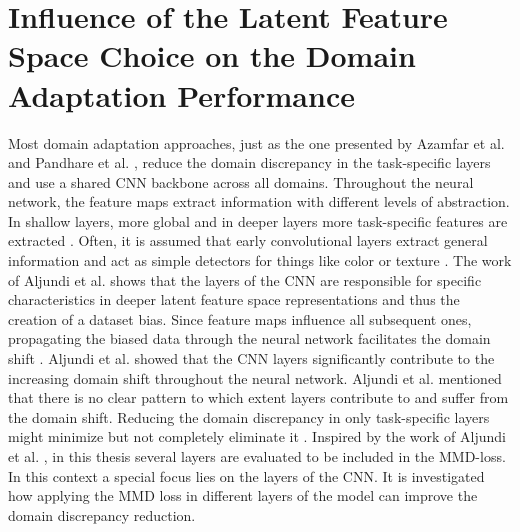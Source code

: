 \section{Influence of the Latent Feature Space Choice on the Domain Adaptation Performance}
Most domain adaptation approaches, just as the one presented by Azamfar et al. \cite{AZAMFAR2020103932} and Pandhare et al. \cite{Pandhare2021}, reduce the domain discrepancy in the task-specific layers and use a shared CNN backbone across all domains. Throughout the neural network, the feature maps extract information with different levels of abstraction. In shallow layers, more global and in deeper layers more task-specific features are extracted \cite{Aljundi2016}. Often, it is assumed that early convolutional layers extract general information and act as simple detectors for things like color or texture \cite{Aljundi2016}. The work of Aljundi et al. \cite{Aljundi2016} shows that the layers of the CNN are responsible for specific characteristics in deeper latent feature space representations and thus the creation of a dataset bias. Since feature maps influence all subsequent ones, propagating the biased data through the neural network facilitates the domain shift \cite{Aljundi2016}. Aljundi et al. \cite{Aljundi2016} showed that the CNN layers significantly contribute to the increasing domain shift throughout the neural network. Aljundi et al. \cite{Aljundi2016} mentioned that there is no clear pattern to which extent layers contribute to and suffer from the domain shift. Reducing the domain discrepancy in only task-specific layers might minimize but not completely eliminate it \cite{li2020}. Inspired by the work of Aljundi et al. \cite{Aljundi2016}, in this thesis several layers are evaluated to be included in the MMD-loss. In this context a special focus lies on the layers of the CNN. It is investigated how applying the MMD loss in different layers of the model can improve the domain discrepancy reduction.


